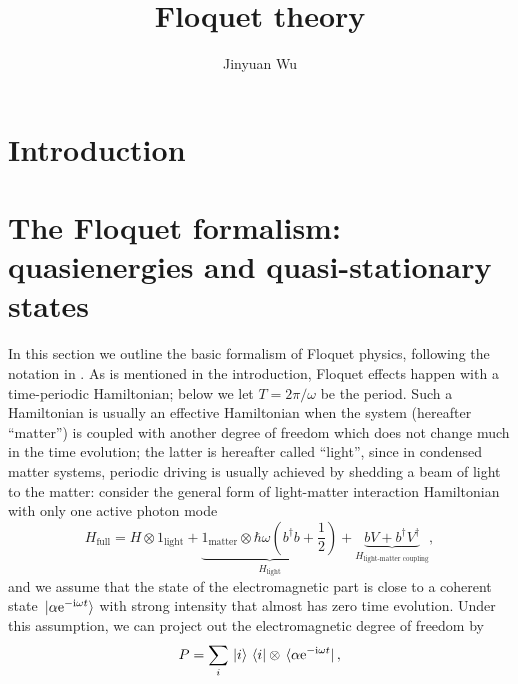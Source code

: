 \documentclass[hyperref, a4paper]{article}
\title{Floquet theory}
\author{Jinyuan Wu}
\newcommand*{\ii}{\mathrm{i}}
\newcommand*{\ee}{\mathrm{e}}
\begin{document}
\maketitle

\section{Introduction} 

\section{The Floquet formalism: quasienergies and quasi-stationary states}

In this section we outline the basic formalism of Floquet physics,
following the notation in \cite{rudner2020floquet}.
As is mentioned in the introduction,
Floquet effects happen with a time-periodic Hamiltonian;
below we let $T = 2 \pi / \omega$ be the period.
Such a Hamiltonian is usually an effective Hamiltonian
when the system (hereafter ``matter'')
is coupled with another degree of freedom
which does not change much in the time evolution;
the latter is hereafter called ``light'',
since in condensed matter systems, 
periodic driving is usually achieved by 
shedding a beam of light to the matter:
consider the general form of light-matter interaction Hamiltonian 
with only one active photon mode
\begin{equation}
    H_{\text{full}} = 
    H \otimes 1_{\text{light}} +     
    \underbrace{
        1_{\text{matter}} \otimes \hbar \omega \left(
        b^\dagger b + \frac{1}{2} 
        \right) 
    }_{H_{\text{light}}}
    + \underbrace{
        b V + b^\dagger V^\dagger  
    }_{H_{\text{light-matter coupling}}} ,
    \label{eq:full-light-matter}
\end{equation}
and we assume that the state of the electromagnetic part 
is close to a coherent state $\ket*{\alpha \ee^{- \ii \omega t}}$ 
with strong intensity that almost has zero time evolution. 
Under this assumption, we can project out the electromagnetic degree of freedom by 
\begin{equation}
    P = \sum_{i} \ket*{i} \bra*{i} \otimes \bra*{\alpha \ee^{- \ii \omega t}}, 
    \label{eq:from-extended-to-matter}
\end{equation} 
\end{document}
